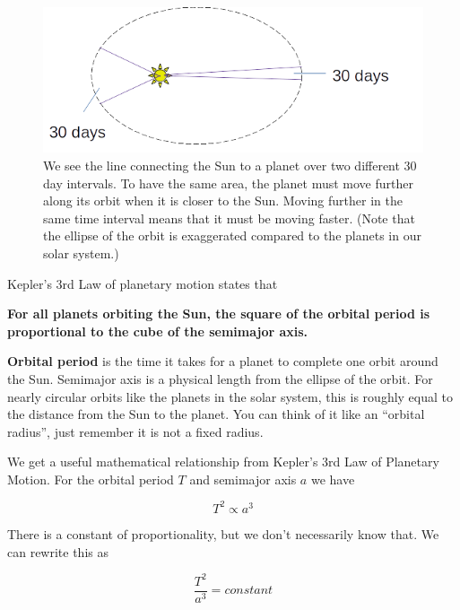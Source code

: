 \documentclass[12pt]{book}
\begin{document}
\begin{figure}[H]
\centering
\includegraphics[scale=0.6]{Keplers2nd.png}
\caption{We see the line connecting the Sun to a planet over two different 30 day intervals. To have the same area, the planet must move further along its orbit when it is closer to the Sun. Moving further in the same time interval means that it must be moving faster. (Note that the ellipse of the orbit is exaggerated compared to the planets in our solar system.)}
\label{Keplers2nd}
\end{figure}

\linespace 

Kepler's 3rd Law of planetary motion states that

\hspace{10pt}

\textbf{For all planets orbiting the Sun, the square of the orbital period is proportional to the cube of the semimajor axis.}

\linespace

\textbf{Orbital period} is the time it takes for a planet to complete one orbit around the Sun. Semimajor axis is a physical length from the ellipse of the orbit. For nearly circular orbits like the planets in the solar system, this is roughly equal to the distance from the Sun to the planet. You can think of it like an ``orbital radius'', just remember it is not a fixed radius.

We get a useful mathematical relationship from Kepler's 3rd Law of Planetary Motion. For the orbital period $T$ and semimajor axis $a$ we have

\begin{equation}
T^2 \propto a^3
\end{equation}

There is a constant of proportionality, but we don't necessarily know that. We can rewrite this as

\begin{equation}
\frac{T^2}{a^3} = constant
\end{equation}
\end{document}
